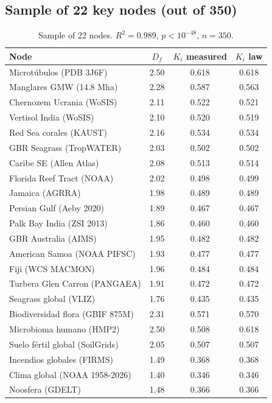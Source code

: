\documentclass[12pt, a4paper]{article}
\theoremstyle{miuThm}
\theoremstyle{remark}
\newcommand{\Rtwo}{0.989}
\begin{document}
\subsection{Sample of 22 key nodes (out of 350)}
\begin{table}[h!]
\centering
\caption{Sample of 22 nodes. $R^2 = \Rtwo$, $p < 10^{-48}$, $n=350$.}
\label{tab:nodos_ki}
\begin{tabular}{lccc}
\toprule
\textbf{Node} & \textbf{$D_f$} & \textbf{$K_i$ measured} & \textbf{$K_i$ law} \\
\midrule
Microtúbulos (PDB 3J6F) & 2.50 & 0.618 & 0.618 \\
Manglares GMW (14.8 Mha) & 2.28 & 0.587 & 0.563 \\
Chernozem Ucrania (WoSIS) & 2.11 & 0.522 & 0.521 \\
Vertisol India (WoSIS) & 2.10 & 0.520 & 0.519 \\
Red Sea corales (KAUST) & 2.16 & 0.534 & 0.534 \\
GBR Seagrass (TropWATER) & 2.03 & 0.502 & 0.502 \\
Caribe SE (Allen Atlas) & 2.08 & 0.513 & 0.514 \\
Florida Reef Tract (NOAA) & 2.02 & 0.498 & 0.499 \\
Jamaica (AGRRA) & 1.98 & 0.489 & 0.489 \\
Persian Gulf (Aeby 2020) & 1.89 & 0.467 & 0.467 \\
Palk Bay India (ZSI 2013) & 1.86 & 0.460 & 0.460 \\
GBR Australia (AIMS) & 1.95 & 0.482 & 0.482 \\
American Samoa (NOAA PIFSC) & 1.93 & 0.477 & 0.477 \\
Fiji (WCS MACMON) & 1.96 & 0.484 & 0.484 \\
Turbera Glen Carron (PANGAEA) & 1.91 & 0.472 & 0.472 \\
Seagrass global (VLIZ) & 1.76 & 0.435 & 0.435 \\
Biodiversidad flora (GBIF 875M) & 2.31 & 0.571 & 0.570 \\
Microbioma humano (HMP2) & 2.50 & 0.508 & 0.618 \\
Suelo fértil global (SoilGrids) & 2.05 & 0.507 & 0.507 \\
Incendios globales (FIRMS) & 1.49 & 0.368 & 0.368 \\
Clima global (NOAA 1958-2026) & 1.40 & 0.346 & 0.346 \\
Noosfera (GDELT) & 1.48 & 0.366 & 0.366 \\
\bottomrule
\end{tabular}
\end{table}
\end{document}
